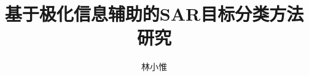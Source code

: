 \documentclass[promaster]{thesis-uestc}
\title{基于极化信息辅助的SAR目标分类方法研究}{Research on SAR target classification method based on polarization information assistance}
\author{林小惟}{Xiaowei Lin}
\begin{document}
\makecover





\thesistableofcontents

% 
% 

% 
% 


% 



%
% 
%


%

% 
% 
\end{document}
